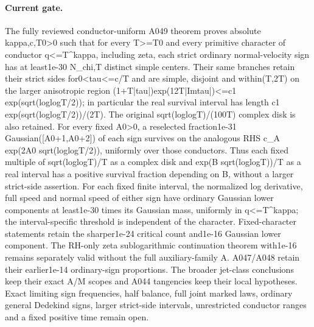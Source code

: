 \paragraph{Current gate.} The fully reviewed conductor-uniform A049 theorem proves absolute kappa,c,T0>0 such that for every T>=T0 and every primitive character of conductor q<=T\textasciicircum{}kappa, including zeta, each strict ordinary normal-velocity sign has at least1e-30 N\_chi,T distinct simple centers. Their same branches retain their strict sides for0<tau<=c/T and are simple, disjoint and within(T,2T) on the larger anisotropic region (1+T|tau|)exp(12T|Imtau|)<=c1 exp(sqrt(loglogT/2)); in particular the real survival interval has length c1 exp(sqrt(loglogT/2))/(2T). The original sqrt(loglogT)/(100T) complex disk is also retained. For every fixed A0>0, a reselected fraction1e-31 Gaussian([A0+1,A0+2]) of each sign survives on the analogous RHS c\_A exp(2A0 sqrt(loglogT/2)), uniformly over those conductors. Thus each fixed multiple of sqrt(loglogT)/T as a complex disk and exp(B sqrt(loglogT))/T as a real interval has a positive survival fraction depending on B, without a larger strict-side assertion. For each fixed finite interval, the normalized log derivative, full speed and normal speed of either sign have ordinary Gaussian lower components at least1e-30 times its Gaussian mass, uniformly in q<=T\textasciicircum{}kappa; the interval-specific threshold is independent of the character. Fixed-character statements retain the sharper1e-24 critical count and1e-16 Gaussian lower component. The RH-only zeta sublogarithmic continuation theorem with1e-16 remains separately valid without the full auxiliary-family A. A047/A048 retain their earlier1e-14 ordinary-sign proportions. The broader jet-class conclusions keep their exact A/M scopes and A044 tangencies keep their local hypotheses. Exact limiting sign frequencies, half balance, full joint marked laws, ordinary general Dedekind signs, larger strict-side intervals, unrestricted conductor ranges and a fixed positive time remain open.
